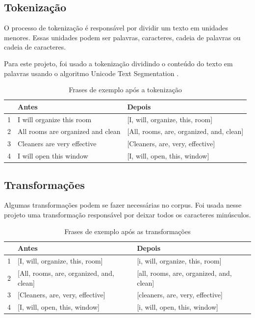 \subsection{Tokenização}
O processo de tokenização é responsável por dividir um texto em unidades menores. Essas unidades podem ser palavras, caracteres, cadeia de palavras ou cadeia de caracteres. 

Para este projeto, foi usado a tokenização dividindo o conteúdo do texto em palavras usando o algoritmo Unicode Text Segmentation \cite{unicodesegmentation}.

\begin{table}[htb]
	\centering
    \def\arraystretch{1.2} %
    \begin{tabular}{|l|l|l|}
        \hline
        & \textbf{Antes} & \textbf{Depois} \\ \hline
        1 & I will organize this room & [I, will, organize, this, room]            \\ \hline
        2 & All rooms are organized and clean & [All, rooms, are, organized, and, clean] \\ \hline
        3 & Cleaners are very effective & [Cleaners, are, very, effective]                              \\ \hline
        4 & I will open this window & [I, will, open, this, window]                             \\ \hline
    \end{tabular}
	\caption{Frases de exemplo após a tokenização}
    \label{tab:tokenization}
\end{table}

\subsection{Transformações}
Algumas transformações podem se fazer necessárias no corpus. Foi usada nesse projeto uma transformação responsável por deixar todos os caracteres minúsculos.

\begin{table}[htb]
	\centering
    \def\arraystretch{1.2} %
    \begin{tabular}{|l|l|l|}
        \hline
        & \textbf{Antes} & \textbf{Depois} \\ \hline
        1 & [I, will, organize, this, room] & [i, will, organize, this, room]            \\ \hline
        2 & [All, rooms, are, organized, and, clean] & [all, rooms, are, organized, and, clean] \\ \hline
        3 & [Cleaners, are, very, effective] & [cleaners, are, very, effective]                              \\ \hline
        4 & [I, will, open, this, window] & [i, will, open, this, window]                             \\ \hline
    \end{tabular}
	\caption{Frases de exemplo após as transformações}
    \label{tab:transformations}
\end{table}

